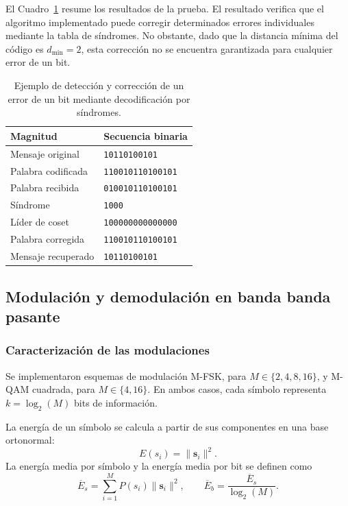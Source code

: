 El Cuadro~\ref{tab:ejemplo_correccion_canal}
resume los resultados de la prueba.
El resultado verifica que el algoritmo implementado
puede corregir determinados errores individuales
mediante la tabla de síndromes.
No obstante, dado que la distancia mínima del
código es $d_{\min}=2$, esta corrección no
se encuentra garantizada para cualquier error
de un bit.

\begin{table}[htbp]
    \centering
    \small
    \begin{tabular}{ll}
        \toprule
        Magnitud & Secuencia binaria \\
        \midrule
        Mensaje original & \texttt{10110100101} \\
        Palabra codificada & \texttt{110010110100101} \\
        Palabra recibida & \texttt{010010110100101} \\
        Síndrome & \texttt{1000} \\
        Líder de coset & \texttt{100000000000000} \\
        Palabra corregida & \texttt{110010110100101} \\
        Mensaje recuperado & \texttt{10110100101} \\
        \bottomrule
    \end{tabular}
    \caption{Ejemplo de detección y corrección de un error
    de un bit mediante decodificación por síndromes.}
    \label{tab:ejemplo_correccion_canal}
\end{table}


\subsection{Modulación y demodulación en banda banda pasante}

\subsubsection{Caracterización de las modulaciones}

Se implementaron esquemas de modulación M-FSK, para
$M \in \{2,4,8,16\}$, y M-QAM cuadrada, para
$M \in \{4,16\}$. En ambos casos, cada símbolo representa
$k=\log_2(M)$ bits de información.

La energía de un símbolo se calcula a partir de sus componentes
en una base ortonormal:
\begin{equation}
    E(s_i)=\|\mathbf{s}_i\|^2.
\end{equation}
La energía media por símbolo y la energía media por bit se
definen como
\begin{equation}
    \overline{E}_s =
    \sum_{i=1}^{M} P(s_i)\|\mathbf{s}_i\|^2,
    \qquad
    \overline{E}_b =
    \frac{\overline{E}_s}{\log_2(M)}.
\end{equation}

